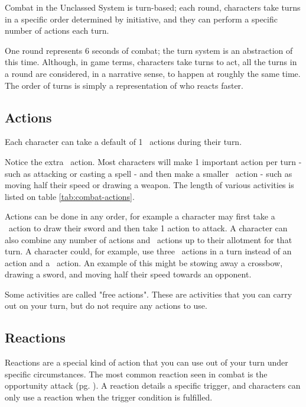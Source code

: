\begin{multicols*}{2}
    Combat in the Unclassed System is turn-based; each round, characters take
    turns in a specific order determined by initiative, and they can perform
    a specific number of actions each turn.

    One round represents 6 seconds of combat; the turn system is an
    abstraction of this time. Although, in game terms, characters take turns to
    act, all the turns in a round are considered, in a narrative sense, to
    happen at roughly the same time. The order of turns is simply a
    representation of who reacts faster.

    \subsection{Actions}
    Each character can take a default of 1 \textonehalf\ actions during
    their turn.

    Notice the extra \textonehalf\ action. Most characters will make 1 important
    action per turn - such as attacking or casting a spell - and then make a
    smaller \textonehalf\ action - such as moving half their speed or drawing a
    weapon. The length of various activities is listed on table
    \ref{tab:combat-actions}.

    Actions can be done in any order, for example a character may first
    take a \textonehalf\ action to draw their sword and then take 1 action to
    attack. A character can also combine any number of actions and
    \textonehalf\ actions up to their allotment for that turn. A character
    could, for example, use three \textonehalf\ actions in a turn instead of
    an action and a \textonehalf\ action. An example of this might be stowing
    away a crossbow, drawing a sword, and moving half their speed towards an
    opponent.

    Some activities are called "free actions". These are
    activities that you can carry out on your turn, but do not require any
    actions to use.

    \subsection{Reactions}
    Reactions are a special kind of action that you can use out of your turn
    under specific circumstances. The most common reaction seen in combat is
    the opportunity attack (pg. \pageref{combat:opportunity-attacks}). A
    reaction details a specific trigger, and characters can only use a reaction
    when the trigger condition is fulfilled.


\end{multicols*}
